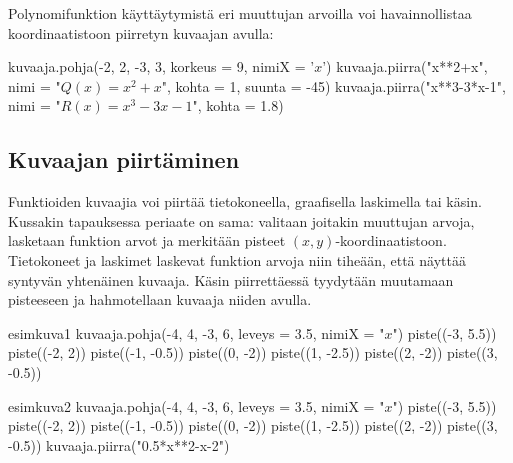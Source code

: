Polynomifunktion käyttäytymistä eri muuttujan arvoilla voi havainnollistaa koordinaatistoon piirretyn kuvaajan avulla:



\begin{kuva}
kuvaaja.pohja(-2, 2, -3, 3, korkeus = 9, nimiX = '$x$')
kuvaaja.piirra("x**2+x", nimi = "$Q(x) = x^2+x$", kohta = 1, suunta = -45)
kuvaaja.piirra("x**3-3*x-1", nimi = "$R(x) = x^3-3x-1$", kohta = 1.8)
\end{kuva}


\newpage

\subsection{Kuvaajan piirtäminen}


Funktioiden kuvaajia voi piirtää tietokoneella, graafisella laskimella tai käsin. Kussakin tapauksessa periaate on sama: valitaan joitakin muuttujan arvoja, lasketaan funktion arvot ja merkitään pisteet $(x,y)$-koordinaatistoon. Tietokoneet ja laskimet laskevat funktion arvoja niin tiheään, että näyttää syntyvän yhtenäinen kuvaaja. Käsin piirrettäessä tyydytään muutamaan pisteeseen ja hahmotellaan kuvaaja niiden avulla.

\begin{luoKuva}{esimkuva1}
kuvaaja.pohja(-4, 4, -3, 6, leveys = 3.5, nimiX = "$x$")
piste((-3, 5.5))
piste((-2, 2))
piste((-1, -0.5))
piste((0, -2))
piste((1, -2.5))
piste((2, -2))
piste((3, -0.5))
\end{luoKuva}
\begin{luoKuva}{esimkuva2}
kuvaaja.pohja(-4, 4, -3, 6, leveys = 3.5, nimiX = "$x$")
piste((-3, 5.5))
piste((-2, 2))
piste((-1, -0.5))
piste((0, -2))
piste((1, -2.5))
piste((2, -2))
piste((3, -0.5))
kuvaaja.piirra("0.5*x**2-x-2")
\end{luoKuva}

